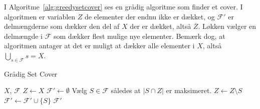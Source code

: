 I Algoritme~\ref{alg:greedysetcover} ses en grådig algoritme som finder et cover. I algoritmen er variablen $Z$ de elementer der endnu ikke er dækket, og $\mathcal{F}'$ er delmængderne som dækker den del af $X$ der er dækket, altså $\overline{Z}$. Løkken vælger en delmængde i $\mathcal{F}$ som dækker flest mulige nye elementer. Bemærk dog, at algoritmen antager at det er muligt at dækker alle elementer i $X$, altså $\bigcup_{s \in \mathcal{F}} s = X$.

\begin{algorithm}
\caption{\label{alg:greedysetcover}Grådig Set Cover}
\begin{algorithmic}
\REQUIRE $X$, $\mathcal{F}$
\STATE $Z \leftarrow X$
\STATE $\mathcal{F}' \leftarrow \emptyset$
    \STATE Vælg $S \in \mathcal{F}$ således at $|S \cap Z|$ er maksimeret.
    \STATE $Z \leftarrow Z \setminus S$
    \STATE $\mathcal{F}' \leftarrow \mathcal{F}' \cup \{S\}$
\ENDWHILE
\RETURN $\mathcal{F}'$
\end{algorithmic}
\end{algorithm}

